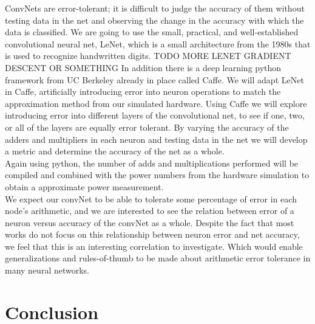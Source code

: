 \documentclass[journal]{IEEEtran}
\begin{document}
	\indent ConvNets are error-tolerant; it is difficult to judge the accuracy of them without testing data in the net and observing the change in  the accuracy with which the data is classified. We are going to use the small, practical, and well-established convolutional neural net, LeNet, which is a small architecture from the 1980s that is used to recognize handwritten digits. TODO MORE LENET GRADIENT DESCENT OR SOMETHING In addition there is a deep learning python framework from UC Berkeley already in place called Caffe. We will adapt LeNet in Caffe, artificially introducing error into neuron operations to match the approximation method from our simulated hardware. Using Caffe we will explore introducing error into different layers of the convolutional net, to see if one, two, or all of the layers are equally error tolerant. By varying the accuracy of the adders and multipliers in each neuron and testing data in the net we will develop a metric and determine the accuracy of the net as a whole.\\

	\indent Again using python, the number of adds and multiplications performed will be compiled and combined with the power numbers from the hardware simulation to obtain a approximate power measurement. \\

	\indent We expect our convNet to be able to tolerate some percentage of error in each node's arithmetic, and we are interested to see the relation between error of a neuron versus accuracy of the convNet as a whole. Despite the fact that most works do not focus on this relationship between neuron error and net accuracy, we feel that this is an interesting correlation to investigate. Which would enable generalizations and rules-of-thumb to be made about arithmetic error tolerance in many neural networks.\\

\section{Conclusion}
\blindtext





\end{document}
